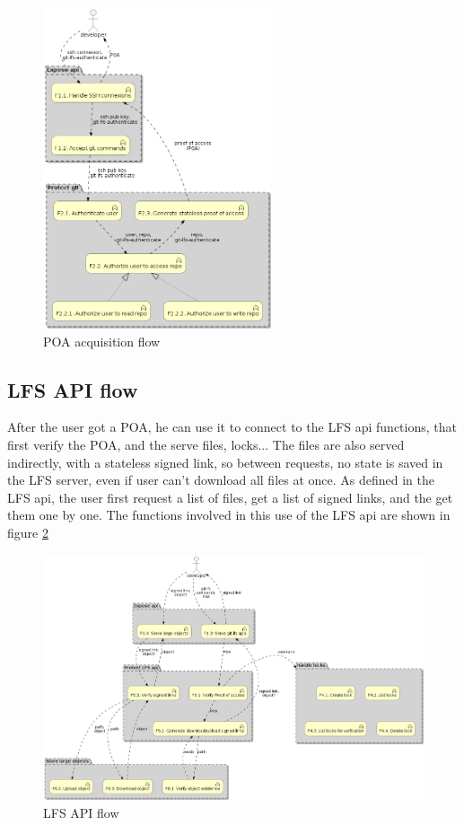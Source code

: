 \begin{figure}[ht]
    \centering
    \includegraphics[width=0.6\textwidth]{iteration_01/diagrams/POA_flow.png}
    \caption{POA acquisition flow}
    \label{fig:POA_flow}
\end{figure}

\newpage
\subsection{LFS API flow}

After the user got a POA, he can use it to connect to the LFS api functions, that first verify the POA, and the serve files, locks... The files are also served indirectly, with a stateless signed link, so between requests, no state is saved in the LFS server, even if user can't download all files at once. As defined in the LFS api, the user first request a list of files, get a list of signed links, and the get them one by one. The functions involved in this use of the LFS api are shown in figure \ref{fig:signed_link_flow}

\begin{figure}[ht]
    \centering
    \includegraphics[width=\textwidth]{iteration_01/diagrams/signed_link_flow.png}
    \caption{LFS API flow}
    \label{fig:signed_link_flow}
\end{figure}
